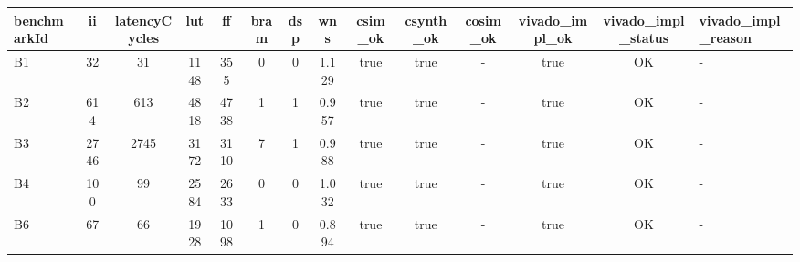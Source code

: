 \begin{tabular}{|l|c|c|c|c|c|c|c|c|c|c|c|c|l|}
\hline
benchmarkId & ii & latencyCycles & lut & ff & bram & dsp & wns & csim\_ok & csynth\_ok & cosim\_ok & vivado\_impl\_ok & vivado\_impl\_status & vivado\_impl\_reason \\
\hline
B1 & 32 & 31 & 1148 & 355 & 0 & 0 & 1.129 & true & true & - & true & OK & - \\
B2 & 614 & 613 & 4818 & 4738 & 1 & 1 & 0.957 & true & true & - & true & OK & - \\
B3 & 2746 & 2745 & 3172 & 3110 & 7 & 1 & 0.988 & true & true & - & true & OK & - \\
B4 & 100 & 99 & 2584 & 2633 & 0 & 0 & 1.032 & true & true & - & true & OK & - \\
B6 & 67 & 66 & 1928 & 1098 & 1 & 0 & 0.894 & true & true & - & true & OK & - \\
\hline
\end{tabular}
